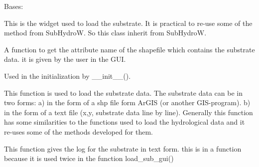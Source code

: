 \documentclass[letterpaper,10pt,english]{sphinxmanual}
\begin{document}
\begin{fulllineitems}
\label{\detokenize{index:src_GUI.hydro_GUI_2.SubstrateW}}
Bases: {\hyperref[\detokenize{index:src_GUI.hydro_GUI_2.SubHydroW}]{}}

This is the widget used to load the substrate. It is practical to re-use some of the method from SubHydroW.
So this class inherit from SubHydroW.

\begin{fulllineitems}
\label{\detokenize{index:src_GUI.hydro_GUI_2.SubstrateW.get_att_name}}
A function to get the attribute name of the shapefile which contains the substrate data. it is given by the user
in the GUI.

\end{fulllineitems}


\begin{fulllineitems}
\label{\detokenize{index:src_GUI.hydro_GUI_2.SubstrateW.init_iu}}
Used in the initialization by \_\_init\_\_().

\end{fulllineitems}


\begin{fulllineitems}
\label{\detokenize{index:src_GUI.hydro_GUI_2.SubstrateW.load_sub_gui}}
This function is used to load the substrate data. The substrate data can be in two forms: a) in the form of a shp
file form ArGIS (or another GIS-program). b) in the form of a text file (x,y, substrate data line by line).
Generally this function has some similarities to the functions used to load the hydrological data and it re-uses
some of the methods developed for them.

\end{fulllineitems}


\begin{fulllineitems}
\label{\detokenize{index:src_GUI.hydro_GUI_2.SubstrateW.log_txt}}
This function gives the log for the substrate in text form. this is in a function because it is used twice in
the function load\_sub\_gui()


\end{fulllineitems}
\end{fulllineitems}
\end{document}
